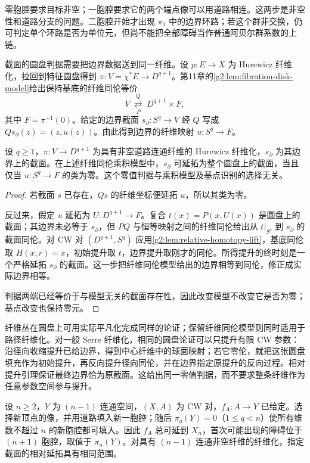 零胞腔要求目标非空；一胞腔要求它的两个端点像可以用道路相连。这两步是非空性和道路分支的问题。二胞腔开始才出现 \(\pi_1\) 中的边界环路；若这个群非交换，仍可判定单个环路是否为单位元，但尚不能把全部障碍当作普通阿贝尔群系数的上链。

\ProseParagraphBreak

截面的圆盘判据需要把边界数据送到同一纤维。设 \(p:E\to X\) 为 Hurewicz 纤维化，拉回到特征圆盘得到 \(\pi:V=\chi^*E\to D^{q+1}\)。第11章的\cref{g2:lem:fibration-disk-model}给出保持基底的纤维同伦等价
\[
	V\ \underset{P}{\stackrel{Q}{\rightleftarrows}}\ D^{q+1}\times F,
\]
其中 \(F=\pi^{-1}(0)\)。给定的边界截面 \(s_\partial:S^q\to V\) 经 \(Q\) 写成 \(Q s_\partial(z)=(z,u(z))\)。由此得到边界的纤维映射 \(u:S^q\to F\)。

\begin{proposition}\label{g2:prop:section-cell-extension}
	设 \(q\ge1\)，\(\pi:V\to D^{q+1}\) 为具有非空道路连通纤维的 Hurewicz 纤维化，\(s_\partial\) 为其边界上的截面。在上述纤维同伦乘积模型中，\(s_\partial\) 可延拓为整个圆盘上的截面，当且仅当 \(u:S^q\to F\) 的类为零。这个零值判据与乘积模型及基点识别的选择无关。
\end{proposition}
\begin{proof}
	若截面 \(s\) 已存在，\(Qs\) 的纤维坐标便延拓 \(u\)，所以其类为零。

	反过来，假定 \(u\) 延拓为 \(U:D^{q+1}\to F\)。复合 \(t(x)=P(x,U(x))\) 是圆盘上的截面；其边界未必等于 \(s_\partial\)，但 \(PQ\) 与恒等映射之间的纤维同伦给出从 \(t|_{S^q}\) 到 \(s_\partial\) 的截面同伦。对 CW 对 \((D^{q+1},S^q)\) 应用\cref{g2:lem:relative-homotopy-lift}，基底同伦取 \(H(x,r)=x\)，初始提升取 \(t\)，边界提升取刚才的同伦。所得提升的终时刻是一个严格延拓 \(s_\partial\) 的截面。这一步把纤维同伦模型给出的边界相等到同伦，修正成实际边界相等。

	判据两端已经等价于与模型无关的截面存在性，因此改变模型不改变它是否为零；基点改变也保持零元。
\end{proof}

纤维丛在圆盘上可用实际平凡化完成同样的论证；保留纤维同伦模型则同时适用于路径纤维化。对一般 Serre 纤维化，相同的圆盘论证可以只提升有限 CW 参数：沿径向收缩提升已给边界，得到中心纤维中的球面映射；若它零伦，就把这张圆盘填充作为初始提升，再反向提升径向同伦，并在边界指定原提升的反向过程。相对提升引理保证最终边界恰为原截面。这给出同一零值判据，而不要求整条纤维作为任意参数空间参与提升。

\begin{example}\label{g2:exm:connectivity-extension-range}
	设 \(n\ge2\)，\(Y\) 为 \((n-1)\) 连通空间，\((X,A)\) 为 CW 对，\(f_A:A\to Y\) 已给定。选择新顶点的像，并用道路填入新一胞腔；随后 \(\pi_q(Y)=0\)（\(1\le q<n\)）使所有维数不超过 \(n\) 的新胞腔都可填入。因此 \(f_A\) 总可延到 \(X_n\)，首次可能出现的障碍位于 \((n+1)\) 胞腔，取值于 \(\pi_n(Y)\)。对具有 \((n-1)\) 连通非空纤维的纤维化，指定截面的相对延拓具有相同范围。
\end{example}


